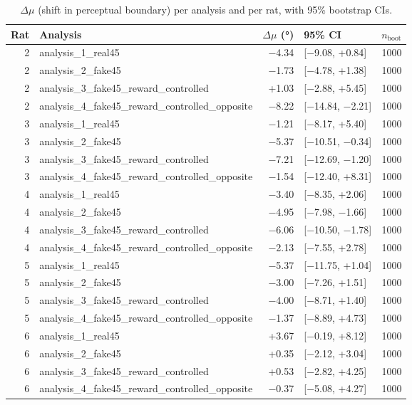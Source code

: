 \begin{table}[htbp]
  \centering
  \caption{$\Delta\mu$ (shift in perceptual boundary) per analysis and per rat, with 95\% bootstrap CIs.}
  \label{tab:choice_delta_mu}
  \begin{tabular}{rlrlr}
    \toprule
    Rat & Analysis & $\Delta\mu$ (°) & 95\% CI & $n_{\mathrm{boot}}$ \\
    \midrule
    2 & analysis\_1\_real45 & −4.34 & [−9.08, +0.84] & 1000 \\
    2 & analysis\_2\_fake45 & −1.73 & [−4.78, +1.38] & 1000 \\
    2 & analysis\_3\_fake45\_reward\_controlled & +1.03 & [−2.88, +5.45] & 1000 \\
    2 & analysis\_4\_fake45\_reward\_controlled\_opposite & −8.22 & [−14.84, −2.21] & 1000 \\
    3 & analysis\_1\_real45 & −1.21 & [−8.17, +5.40] & 1000 \\
    3 & analysis\_2\_fake45 & −5.37 & [−10.51, −0.34] & 1000 \\
    3 & analysis\_3\_fake45\_reward\_controlled & −7.21 & [−12.69, −1.20] & 1000 \\
    3 & analysis\_4\_fake45\_reward\_controlled\_opposite & −1.54 & [−12.40, +8.31] & 1000 \\
    4 & analysis\_1\_real45 & −3.40 & [−8.35, +2.06] & 1000 \\
    4 & analysis\_2\_fake45 & −4.95 & [−7.98, −1.66] & 1000 \\
    4 & analysis\_3\_fake45\_reward\_controlled & −6.06 & [−10.50, −1.78] & 1000 \\
    4 & analysis\_4\_fake45\_reward\_controlled\_opposite & −2.13 & [−7.55, +2.78] & 1000 \\
    5 & analysis\_1\_real45 & −5.37 & [−11.75, +1.04] & 1000 \\
    5 & analysis\_2\_fake45 & −3.00 & [−7.26, +1.51] & 1000 \\
    5 & analysis\_3\_fake45\_reward\_controlled & −4.00 & [−8.71, +1.40] & 1000 \\
    5 & analysis\_4\_fake45\_reward\_controlled\_opposite & −1.37 & [−8.89, +4.73] & 1000 \\
    6 & analysis\_1\_real45 & +3.67 & [−0.19, +8.12] & 1000 \\
    6 & analysis\_2\_fake45 & +0.35 & [−2.12, +3.04] & 1000 \\
    6 & analysis\_3\_fake45\_reward\_controlled & +0.53 & [−2.82, +4.25] & 1000 \\
    6 & analysis\_4\_fake45\_reward\_controlled\_opposite & −0.37 & [−5.08, +4.27] & 1000 \\

\end{tabular}
\end{table}
